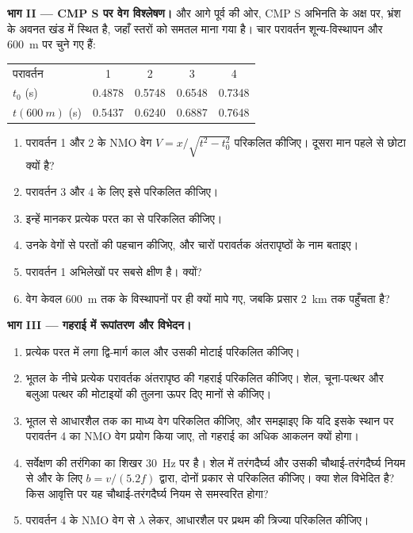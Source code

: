 \begin{problem}
\noindent\textbf{भाग II --- CMP S पर वेग विश्लेषण।} और आगे पूर्व की ओर, CMP S
अभिनति के अक्ष पर, भ्रंश के अवनत खंड में स्थित है,
जहाँ स्तरों को समतल माना गया है। चार परावर्तन शून्य-विस्थापन और
\qty{600}{m} पर चुने गए हैं:
\begin{center}
\small
\begin{tabular}{lcccc}
\hline
परावर्तन & 1 & 2 & 3 & 4 \\
$t_0$ (\unit{s}) & 0.4878 & 0.5748 & 0.6548 & 0.7348 \\
$t(\qty{600}{m})$ (\unit{s}) & 0.5437 & 0.6240 & 0.6887 & 0.7648 \\
\hline
\end{tabular}
\end{center}
\begin{enumerate}[resume]
  \item परावर्तन 1 और 2 के NMO वेग $V = x/\sqrt{t^2 - t_0^2}$ परिकलित कीजिए।
        दूसरा मान पहले से छोटा क्यों है?
  \item परावर्तन 3 और 4 के लिए इसे परिकलित कीजिए।
  \item इन्हें  मानकर प्रत्येक परत का 
         से परिकलित कीजिए।
  \item उनके वेगों से परतों की पहचान कीजिए, और चारों परावर्तक
        अंतरापृष्ठों के नाम बताइए।
  \item परावर्तन 1 अभिलेखों पर सबसे क्षीण है। क्यों?
  \item वेग केवल \qty{600}{m} तक के विस्थापनों पर ही क्यों मापे गए,
        जबकि प्रसार \qty{2}{km} तक पहुँचता है?
\end{enumerate}

\noindent\textbf{भाग III --- गहराई में रूपांतरण और विभेदन।}
\begin{enumerate}[resume]
  \item प्रत्येक परत में लगा द्वि-मार्ग काल और उसकी मोटाई परिकलित कीजिए।
  \item भूतल के नीचे प्रत्येक परावर्तक अंतरापृष्ठ की गहराई परिकलित कीजिए।
        शेल, चूना-पत्थर और बलुआ पत्थर की मोटाइयों की तुलना ऊपर दिए
        मानों से कीजिए।
  \item भूतल से आधारशैल तक का माध्य वेग परिकलित कीजिए, और समझाइए कि यदि
        इसके स्थान पर परावर्तन 4 का NMO वेग प्रयोग किया जाए, तो गहराई का
        अधिक आकलन क्यों होगा।
  \item सर्वेक्षण की तरंगिका का शिखर \qty{30}{Hz} पर है। शेल में तरंगदैर्घ्य
        और उसकी  चौथाई-तरंगदैर्घ्य नियम से और  के
        लिए $b = v/(5.2f)$ द्वारा, दोनों प्रकार से परिकलित कीजिए। क्या शेल
        विभेदित है? किस आवृत्ति पर यह चौथाई-तरंगदैर्घ्य नियम से समस्वरित होगा?
  \item परावर्तन 4 के NMO वेग से $\lambda$ लेकर, आधारशैल पर प्रथम  की त्रिज्या परिकलित कीजिए।
\end{enumerate}


\end{problem}
